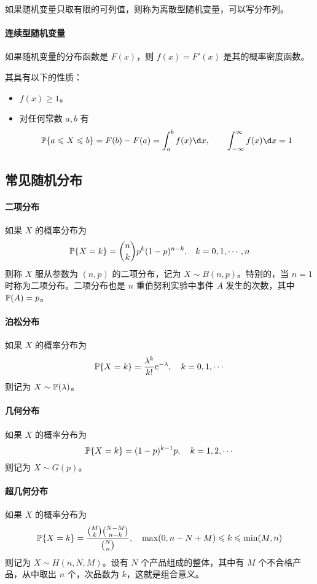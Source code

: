如果随机变量只取有限的可列值，则称为离散型随机变量，可以写分布列。

\paragraph{连续型随机变量}

如果随机变量的分布函数是 $F(x)$，则 $f(x) = F'(x)$ 是其的概率密度函数。

其具有以下的性质：

\begin{itemize}
	\item $f(x) \geqslant 1$。
	\item 对任何常数 $a, b$ 有
	      \[ \bbP\{a \leqslant X \leqslant b\} = F(b) - F(a) = \int_{a}^{b} f(x) \d x, \qquad \int_{-\infty}^{\infty} f(x) \d x = 1 \]
\end{itemize}

\subsection{常见随机分布}

\paragraph{二项分布}
如果 $X$ 的概率分布为
\[ \mathbb{P}\{X = k\} = \binom{n}{k} p^k(1 - p)^{n-k}. \quad k = 0, 1, \cdots, n \]
则称 $X$ 服从参数为 $(n, p)$ 的二项分布，记为 $X \sim B(n, p)$。特别的，当 $n=1$ 时称为二项分布。二项分布也是 $n$ 重伯努利实验中事件 $A$ 发生的次数，其中 $\mathbb{P}(A) = p$。

\paragraph{泊松分布}
如果 $X$ 的概率分布为
\[ \mathbb{P}\{X = k\} = \frac{\lambda^k}{k!} \mathrm{e}^{-\lambda} , \quad k = 0, 1, \cdots \]
则记为 $X \sim \mathbb{P}(\lambda)$。

\paragraph{几何分布}
如果 $X$ 的概率分布为
\[ \mathbb{P}\{X=k\} = (1 - p)^{k-1}p, \quad k = 1, 2, \cdots \]
则记为 $X \sim G(p)$。

\paragraph{超几何分布}
如果 $X$ 的概率分布为
\[ \mathbb{P}\{X = k\} = \frac{\binom{M}{k} \binom{N - M}{n - k}}{\binom{N}{n}}, \quad \max(0, n - N + M) \leqslant k \leqslant \min(M, n) \]
则记为 $X \sim H(n, N, M)$。设有 $N$ 个产品组成的整体，其中有 $M$ 个不合格产品，从中取出 $n$ 个，次品数为 $k$，这就是组合意义。


